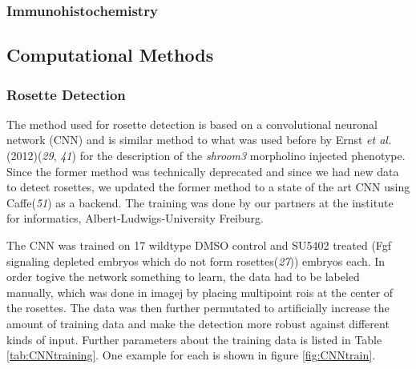 \documentclass[11pt,singlespacinge,twoside]{reedthesis} %
\begin{document}
\hypertarget{Immn-met}{%
\subsubsection{Immunohistochemistry}\label{Immn-met}}

\hypertarget{comp-met}{%
\subsection{Computational Methods}\label{comp-met}}

\hypertarget{CNN}{%
\subsubsection{Rosette Detection}\label{CNN}}

The method used for rosette detection is based on a convolutional neuronal network (CNN) and is similar method to what was used before by Ernst \emph{et al.}(2012)(\emph{29}, \emph{41}) for the description of the \emph{shroom3} morpholino injected phenotype. Since the former method was technically deprecated and since we had new data to detect rosettes, we updated the former method to a state of the art CNN using Caffe(\emph{51}) as a backend. The training was done by our partners at the institute for informatics, Albert-Ludwigs-University Freiburg.

The CNN was trained on 17 wildtype DMSO control and SU5402 treated (Fgf signaling depleted embryos which do not form rosettes(\emph{27})) embryos each. In order togive the network something to learn, the data had to be labeled manually, which was done in imagej by placing multipoint rois at the center of the rosettes. The data was then further permutated to artificially increase the amount of training data and make the detection more robust against different kinds of input. Further parameters about the training data is listed in Table \ref{tab:CNNtraining}. One example for each is shown in figure \ref{fig:CNNtrain}.
\end{document}
